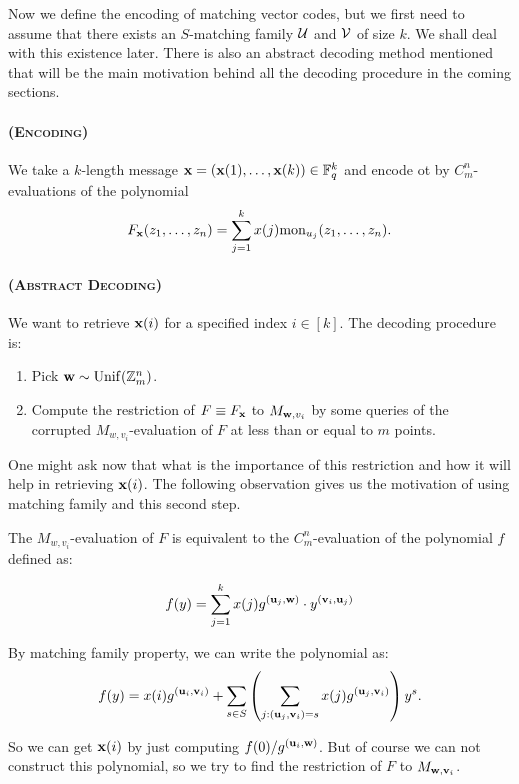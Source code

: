 Now we define the encoding of matching vector codes, but we first need to assume that there exists an $S$-matching family $\mathcal{U}$ and $\mathcal{V}$ of size $k$. We shall deal with this existence later. There is also an abstract decoding method mentioned that will be the main motivation behind all the decoding procedure in the coming sections.

\begin{greybox}
   \paragraph{\large (\textsc{Encoding})} We take a $k$-length message $\mathbf{x}=(\mathbf{x}(1), \ldots, \mathbf{x}(k))\in\mathbb{F}_q^k$ and encode ot by $C_m^n$-evaluations of the polynomial 
   \begin{equation}  \label{enc}
   F_{\mathbf{x}}(z_1,\ldots,z_n) = \sum_{j=1}^{k} x(j)\mathrm{mon}_{u_j}(z_1,\ldots,z_n).
\end{equation}
  

    \paragraph{\large (\textsc{Abstract Decoding})} We want to retrieve $\mathbf{x}(i)$ for a specified index $i\in[k]$. The decoding procedure is:
    \begin{enumerate}
        \item Pick $\mathbf{w}\sim\mathrm{Unif}(\mathbb{Z}_m^n)$. 
        \item Compute the restriction of $F \equiv F_{\mathbf{x}}$ to $M_{\mathbf{w}, v_i}$ by some queries of the corrupted $M_{w,v_i}$-evaluation of $F$ at less than or equal to $m$ points.
    \end{enumerate}
\end{greybox}

One might ask now that what is the importance of this restriction and how it will help in retrieving $\mathbf{x}(i)$. The following observation gives us the motivation of using matching family and this second step.

\begin{observation}
        The $M_{w,v_i}$-evaluation of $F$ is equivalent to the $C_m^n$-evaluation of the polynomial $f$ defined as:

        \[
            f(y) = \sum_{j=1}^{k} x(j) g^{(\mathbf{u}_j, \mathbf{w})}\cdot y^{(\mathbf{v}_i, \mathbf{u}_j)}
        \]

        By matching family property, we can write the polynomial as:
        \[
            f(y) = x(i)g^{(\mathbf{u}_i, \mathbf{v}_i)} + \sum_{s\in S} \left(\sum_{j : (\mathbf{u}_j, \mathbf{v}_i) = s} x(j)g^{(\mathbf{u}_j, \mathbf{v}_i)} \right)y^s.
        \]  

        So we can get $\mathbf{x}(i)$ by just computing $f(0)/g^{(\mathbf{u}_i, \mathbf{w})}$. But of course we can not construct this polynomial, so we try to find the restriction of $F$ to $M_{\mathbf{w}, \mathbf{v}_i}$.
    \end{observation}

